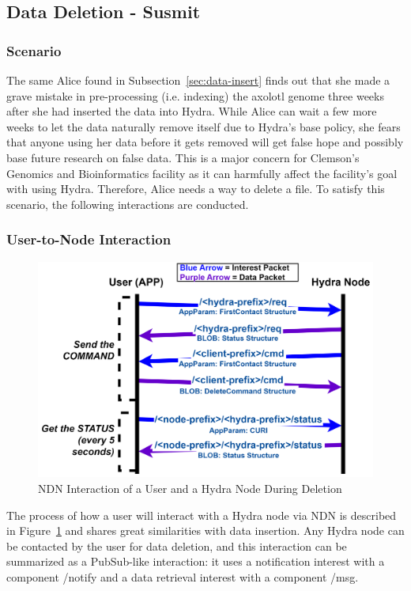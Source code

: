 \subsection{Data Deletion - Susmit} \label{sec:data-delete}


\subsubsection{Scenario} 
The same Alice found in Subsection~\ref{sec:data-insert} finds out that she made a grave mistake in pre-processing (i.e. indexing) the axolotl genome three weeks after she had inserted the data into Hydra. While Alice can wait a few more weeks to let the data naturally remove itself due to Hydra's base policy, she fears that anyone using her data before it gets removed will get false hope and possibly base future research on false data. This is a major concern for Clemson's Genomics and Bioinformatics facility as it can harmfully affect the facility's goal with using Hydra. Therefore, Alice needs a way to delete a file. To satisfy this scenario, the following interactions are conducted.


\subsubsection{User-to-Node Interaction} 
\begin{figure}[!ht]
    \centering
    \includegraphics[width=\columnwidth]{visuals/delete-usr.png}
    \caption{NDN Interaction of a User and a Hydra Node During Deletion}
    \label{fig:delete-usr}
\end{figure}

The process of how a user will interact with a Hydra node via NDN is described in Figure~\ref{fig:delete-usr} and shares great similarities with data insertion. Any Hydra node can be contacted by the user for data deletion, and this interaction can be summarized as a PubSub-like interaction: it uses a notification interest with a component /notify and a data retrieval interest with a component /msg.

